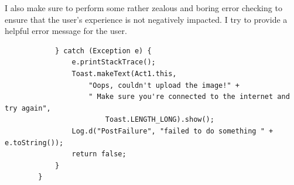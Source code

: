 \documentclass[12pt]{article}
\begin{document}
I also make sure to perform some rather zealous and boring error checking to ensure that the user's experience is not negatively impacted. I try to provide a helpful error message for the user.

\begin{verbatim}
            } catch (Exception e) {
                e.printStackTrace();
                Toast.makeText(Act1.this,
                    "Oops, couldn't upload the image!" +
                    " Make sure you're connected to the internet and try again",
                        Toast.LENGTH_LONG).show();
                Log.d("PostFailure", "failed to do something " + e.toString());
                return false;
            }
        }
\end{verbatim}
\end{document}
